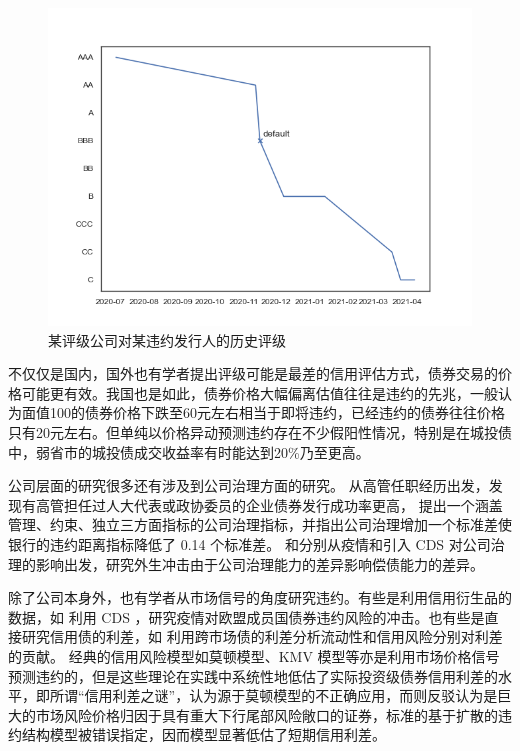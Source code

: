 \begin{figure}[h]
	\centering
	\includegraphics[width=0.9\linewidth]{./data/rating_of_zg.png}
	\caption{某评级公司对某违约发行人的历史评级}
	\label{fig:rating_of_zg}
\end{figure}
不仅仅是国内，国外也有学者提出评级可能是最差的信用评估方式\cite{blochlinger2018ratings}，债券交易的价格可能更有效\cite{badoer2019relevance}。我国也是如此，债券价格大幅偏离估值往往是违约的先兆，一般认为面值100的债券价格下跌至60元左右相当于即将违约，已经违约的债券往往价格只有20元左右。但单纯以价格异动预测违约存在不少假阳性情况，特别是在城投债中，弱省市的城投债成交收益率有时能达到20\%乃至更高。

公司层面的研究很多还有涉及到公司治理方面的研究。
\Textcite{林晚发2018高管任职经历的得与失}从高管任职经历出发，发现有高管担任过人大代表或政协委员的企业债券发行成功率更高，
\Textcite{anginer2018corporate}提出一个涵盖管理、约束、独立三方面指标的公司治理指标，并指出公司治理增加一个标准差使银行的违约距离指标降低了 0.14 个标准差。
\Textcite{ding2021corporate}和\Textcite{subrahmanyam2017credit}分别从疫情和引入 CDS 对公司治理的影响出发，研究外生冲击由于公司治理能力的差异影响偿债能力的差异。

除了公司本身外，也有学者从市场信号的角度研究违约。有些是利用信用衍生品的数据，如\Textcite{bonaccolto2021breakup} 利用 CDS ，研究疫情对欧盟成员国债券违约风险的冲击。也有些是直接研究信用债的利差，如\Textcite{纪志宏2017信用风险溢价还是市场流动性溢价} 利用跨市场债的利差分析流动性和信用风险分别对利差的贡献。
经典的信用风险模型如莫顿模型、KMV 模型等亦是利用市场价格信号预测违约的，但是这些理论在实践中系统性地低估了实际投资级债券信用利差的水平，即所谓“信用利差之谜”，\Textcite{feldhutter2018myth}认为源于莫顿模型的不正确应用，而\Textcite{bai2020credit}则反驳认为是巨大的市场风险价格归因于具有重大下行尾部风险敞口的证券，标准的基于扩散的违约结构模型被错误指定，因而模型显著低估了短期信用利差。

